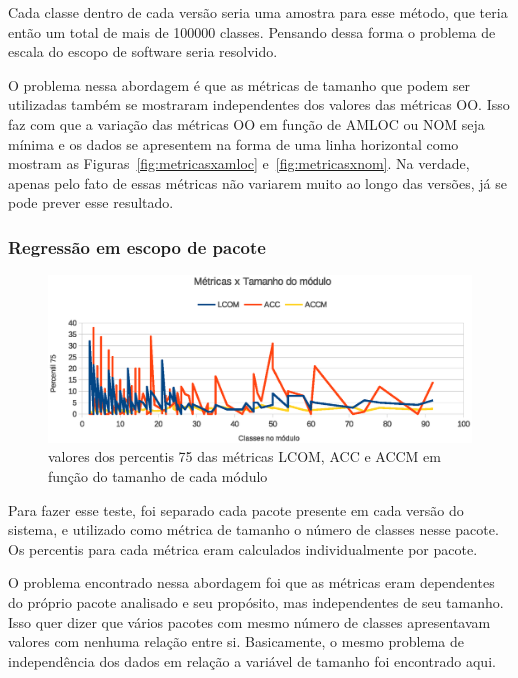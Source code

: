 Cada classe dentro de cada versão seria uma amostra para esse método, que teria então um total de mais de 100000 classes. Pensando dessa forma o problema de escala do escopo de software seria resolvido.

O problema nessa abordagem é que as métricas de tamanho que podem ser utilizadas também se mostraram independentes dos valores das métricas OO. Isso faz com que a variação das métricas OO em função de AMLOC ou NOM seja mínima e os dados se apresentem na forma de uma linha horizontal como mostram as Figuras~\ref{fig:metricasxamloc} e~\ref{fig:metricasxnom}. Na verdade, apenas pelo fato de essas métricas não variarem muito ao longo das versões, já se pode prever esse resultado.

\subsubsection{Regressão em escopo de pacote}

\begin{figure}[!htb]
\centering
\includegraphics [keepaspectratio=true,scale=0.7]{figuras/metricasxtamanhomodulo.eps}
\caption{valores dos percentis 75 das métricas LCOM, ACC e ACCM em função do tamanho de cada módulo}
\label{fig:metricasxtamanhomodulo}
\end{figure}

Para fazer esse teste, foi separado cada pacote presente em cada versão do sistema, e utilizado como métrica de tamanho o número de classes nesse pacote. Os percentis para cada métrica eram calculados individualmente por pacote.

O problema encontrado nessa abordagem foi que as métricas eram dependentes do próprio pacote analisado e seu propósito, mas independentes de seu tamanho. Isso quer dizer que vários pacotes com mesmo número de classes apresentavam valores com nenhuma relação entre si. Basicamente, o mesmo problema de independência dos dados em relação a variável de tamanho foi encontrado aqui.

